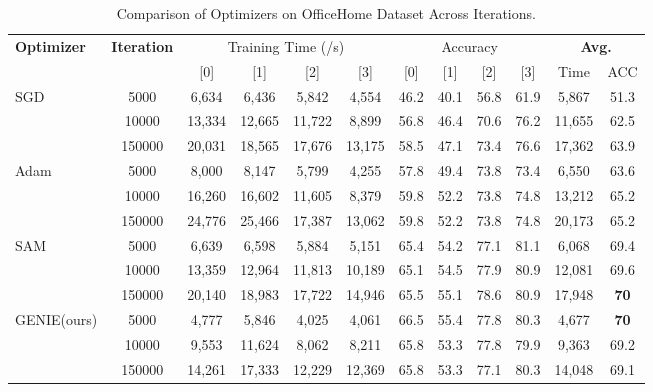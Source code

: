 \documentclass{article}
\theoremstyle{plain}
\theoremstyle{definition}
\theoremstyle{remark}
\begin{document}
\begin{table}[H]
\centering
\caption{Comparison of Optimizers on OfficeHome Dataset Across Iterations.}
\label{tab:officehome_iter}
\vskip 0.15in
\begin{center}
\begin{small}
\begin{sc}
\begin{tabular}{l|c|cccc|cccc|c|c}
\toprule
\textbf{Optimizer}& \textbf{Iteration} & \multicolumn{4}{c}{Training Time (/s)} & \multicolumn{4}{c}{Accuracy} & \multicolumn{2}{c}{\textbf{Avg.}}\\
\cmidrule(lr){3-10}
 & & [0] & [1] & [2] & [3] & [0] & [1] & [2] & [3] & Time & ACC\\ 
\midrule
SGD & 5000 & 6,634& 6,436& 5,842& 4,554& 46.2& 40.1& 56.8& 61.9& 5,867& 51.3\\
    & 10000 & 13,334& 12,665& 11,722& 8,899& 56.8& 46.4& 70.6& 76.2& 11,655& 62.5\\
    & 150000 & 20,031& 18,565& 17,676& 13,175& 58.5& 47.1& 73.4& 76.6& 17,362& 63.9\\
\midrule
Adam & 5000 & 8,000& 8,147& 5,799& 4,255& 57.8& 49.4& 73.8& 73.4& 6,550& 63.6\\
     & 10000 & 16,260& 16,602& 11,605& 8,379& 59.8& 52.2& 73.8& 74.8& 13,212& 65.2\\
     & 150000 & 24,776& 25,466& 17,387& 13,062& 59.8& 52.2& 73.8& 74.8& 20,173& 65.2\\
\midrule
SAM & 5000 & 6,639& 6,598& 5,884& 5,151& 65.4& 54.2& 77.1& 81.1& 6,068& 69.4\\
    & 10000 & 13,359& 12,964& 11,813& 10,189& 65.1& 54.5& 77.9& 80.9& 12,081& 69.6\\
    & 150000 & 20,140& 18,983& 17,722& 14,946& 65.5& 55.1& 78.6& 80.9& 17,948& \textbf{70}\\
\midrule
GENIE(ours) & 5000 & 4,777& 5,846& 4,025& 4,061& 66.5& 55.4& 77.8& 80.3& 4,677& \textbf{70}\\
      & 10000 & 9,553& 11,624& 8,062& 8,211& 65.8& 53.3& 77.8& 79.9& 9,363& 69.2\\
      & 150000 & 14,261& 17,333& 12,229& 12,369& 65.8& 53.3& 77.1& 80.3& 14,048& 69.1\\
\bottomrule
\end{tabular}
\end{sc}
\end{small}
\end{center}
\vskip -0.1in
\end{table}
\end{document}
